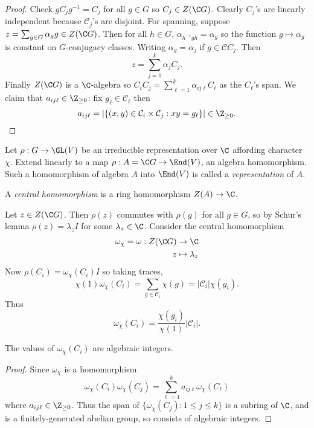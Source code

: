 \documentclass[a4paper]{article}
\newcommand{\ccl}{{\mathcal C}} %
\theoremstyle{definition}
\begin{document}
\begin{proof}
  Check \(g C_j g^{-1} = C_j\) for all \(g \in G\) so \(C_j \in Z(\C G)\). Clearly \(C_j\)'s are linearly independent because \(\ccl_j\)'s are disjoint. For spanning, suppose \(z = \sum_{g \in G} \alpha_g g \in Z(\C G)\). Then for all \(h \in G\), \(\alpha_{h^{-1}gh} = \alpha_g\) so the function \(g \mapsto \alpha_g\) is constant on \(G\)-conjugacy classes. Writing \(\alpha_g = \alpha_j\) if \(g \in \ccl C_j\). Then
  \[
    z = \sum_{j = 1}^k \alpha_j C_j.
  \]
  Finally \(Z(\C G)\) is a \(\C\)-algebra so \(C_iC_j = \sum_{\ell = 1}^k \alpha_{ij\ell} C_\ell\) as the \(C_\ell\)'s span. We claim that \(a_{ij\ell} \in \Z_{\geq 0}\): fix \(g_\ell \in \ccl_\ell\) then
    \[
      a_{ij\ell} = |\{(x, y) \in \ccl_i \times \ccl_j: xy = g_\ell\}| \in \Z_{\geq 0}.
    \]
\end{proof}

\begin{definition}
  Let \(\rho: G \to \GL(V)\) be an irreducible representation over \(\C\) affording character \(\chi\). Extend linearly to a map \(\rho: A = \C G \to \End(V)\), an algebra homomorphism. Such a homomorphism of algebra \(A\) into \(\End(V)\) is called a \emph{representation} of \(A\).

  A \emph{central homomorphism} is a ring homomorphism \(Z(A) \to \C\).
\end{definition}

Let \(z \in Z(\C G)\). Then \(\rho(z)\) commutes with \(\rho(g)\) for all \(g \in G\), so by Schur's lemma \(\rho(z) = \lambda_z I\) for some \(\lambda_z \in \C\). Consider the central homomorphism
\begin{align*}
  \omega_\chi = \omega: Z(\C G) &\to \C \\
  z &\mapsto \lambda_z
\end{align*}
Now \(\rho(C_i) = \omega_\chi(C_i) I\) so taking traces,
\[
  \chi(1) \omega_\chi(C_i)
  = \sum_{g \in \ccl_i} \chi(g)
  = |\ccl_i| \chi(g_i).
\]
Thus
\[
  \omega_\chi(C_i) = \frac{\chi(g_i)}{\chi(1)} |\ccl_i|.
\]

\begin{lemma}
  The values of \(\omega_\chi(C_i)\) are algebraic integers.
\end{lemma}

\begin{proof}
  Since \(\omega_\chi\) is a homomorphism
  \[
    \omega_\chi(C_i) \omega_\chi(C_j) = \sum_{\ell = 1}^k a_{ij\ell} \omega_\chi (C_\ell)
  \]
  where \(a_{ij\ell} \in \Z_{\geq 0}\). Thus the span of \(\{\omega_\chi(C_j): 1 \leq j \leq k\}\) is a subring of \(\C\), and is a finitely-generated abelian group, so consists of algebraic integers.
\end{proof}
\end{document}
